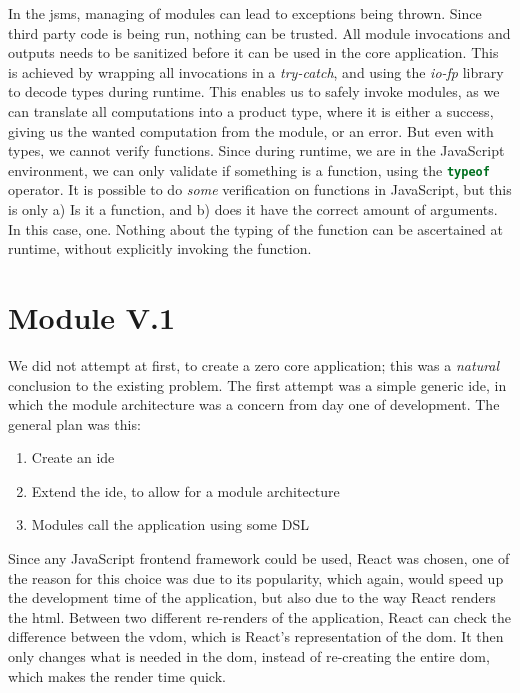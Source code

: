 In the \gls{jsms}, managing of modules can lead to exceptions being thrown.
Since third party code is being run, nothing can be trusted. All module
invocations and outputs needs to be sanitized before it can be used in the core
application. This is achieved by wrapping all invocations in a
\textit{try-catch}, and using the \textit{io-fp} library to decode types during
runtime. This enables us to safely invoke modules, as we can translate all
computations into a product type, where it is either a success, giving us the
wanted computation from the module, or an error. But even with types, we cannot
verify functions. Since during runtime, we are in the JavaScript environment,
we can only validate if something is a function, using the
\lstinline[language=JavaScript]{typeof} operator. It is possible to do
\textit{some} verification on functions in JavaScript, but this is only a) Is it
a function, and b) does it have the correct amount of arguments. In this case,
one. Nothing about the typing of the function can be ascertained at runtime,
without explicitly invoking the function.

\section{Module V.1} \label{sec:mod1}

We did not attempt at first, to create a zero core application; this was a
\textit{natural} conclusion to the existing problem. The first attempt was a
simple generic \gls{ide}, in which the module architecture was a concern from
day one of development. The general plan was this:

\begin{enumerate}
  \item Create an \gls{ide}
  \item Extend the \gls{ide}, to allow for a module architecture
  \item Modules call the application using some DSL
\end{enumerate}

Since any JavaScript frontend framework could be used, React was chosen, one of
the reason for this choice was due to its popularity, which again, would speed
up the development time of the application, but also due to the way React
renders the \gls{html}. Between two different re-renders of the application,
React can check the difference between the \gls{vdom}, which is React's
representation of the \gls{dom}. It then only changes what is needed in the
\gls{dom}, instead of re-creating the entire \gls{dom}, which makes the render
time quick.

